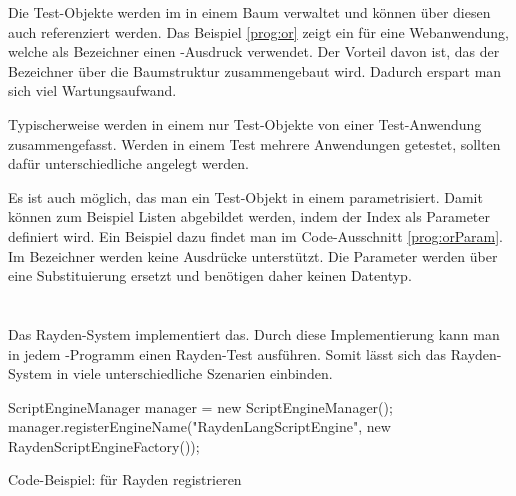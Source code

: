 \SuperPar
Die Test-Objekte werden im  in einem Baum verwaltet und können über diesen auch referenziert werden. Das Beispiel \ref{prog:or} zeigt ein  für eine Webanwendung, welche als Bezeichner einen -Ausdruck verwendet.  Der Vorteil davon ist, das der Bezeichner  über die Baumstruktur zusammengebaut wird. Dadurch erspart man sich viel Wartungsaufwand. 

\SuperPar
Typischerweise werden in einem  nur Test-Objekte von einer Test-Anwendung zusammengefasst. Werden in einem Test mehrere Anwendungen getestet, sollten dafür unterschiedliche  angelegt werden.

\begin{program}
\caption{}
\label{prog:orParam}
\end{program}

\SuperPar
Es ist auch möglich, das man ein Test-Objekt in einem  parametrisiert. Damit können zum Beispiel Listen abgebildet werden, indem der Index als Parameter definiert wird. Ein Beispiel dazu findet man im Code-Ausschnitt \ref{prog:orParam}. Im Bezeichner  werden keine Ausdrücke unterstützt. Die Parameter werden über eine Substituierung ersetzt und benötigen daher keinen Datentyp.



\section{}

Das Rayden-System implementiert das. Durch diese Implementierung kann man in jedem -Programm einen Rayden-Test ausführen. Somit lässt sich das Rayden-System in viele unterschiedliche Szenarien einbinden. 

\begin{program}
\begin{JavaCode}
ScriptEngineManager manager = new ScriptEngineManager();
manager.registerEngineName("RaydenLangScriptEngine", new RaydenScriptEngineFactory());
\end{JavaCode}
\caption{Code-Beispiel:  für Rayden registrieren}
\label{prog:registerFactory}
\end{program}

